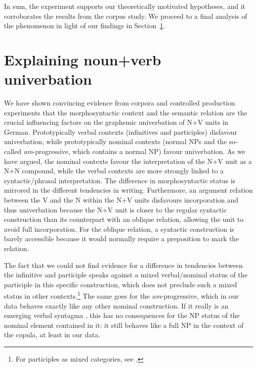 \documentclass[biblatex, charis, linguex]{glossa}\usepackage{knitr}
\begin{document}
In sum, the experiment supports our theoretically motivated hypotheses, and it corroborates the results from the corpus study.
We proceed to a final analysis of the phenomenon in light of our findings in Section~\ref{sec:explainingnounverbuniverbation}.





\section{Explaining noun+verb univerbation}
\label{sec:explainingnounverbuniverbation}

We have shown convincing evidence from corpora and controlled production experiments that the morphosyntactic context and the semantic relation are the crucial influencing factors on the graphemic univerbation of N+V units in German.
Prototypically verbal contexts (infinitives and participles) disfavour univerbation, while prototypically nominal contexts (normal NPs and the so-called \textit{am}-progressive, which contains a normal NP) favour univerbation.
As we have argued, the nominal contexts favour the interpretation of the N+V unit as a N+N compound, while the verbal contexts are more strongly linked to a syntactic\slash phrasal interpretation.
The difference in morphosyntactic status is mirrored in the different tendencies in writing.
Furthermore, an argument relation between the V and the N within the N+V units disfavours incorporation and thus univerbation because the N+V unit is closer to the regular syntactic construction than its counterpart with an oblique relation, allowing the unit to avoid full incorporation.
For the oblique relation, a syntactic construction is barely accessible because it would normally require a preposition to mark the relation.

The fact that we could not find evidence for a difference in tendencies between the infinitive and participle speaks against a mixed verbal\slash nominal status of the participle in this specific construction, which does not preclude such a mixed status in other contexts.\footnote{%
For participles as mixed categories, see \citet{BorikGehrke2019}.}
The same goes for the \textit{am}-progressive, which in our data behaves exactly like any other nominal construction.
If it really is an emerging verbal syntagma \citep{AnthonissenEa2016}, this has no consequences for the NP status of the nominal element contained in it: it still behaves like a full NP in the context of the copula, at least in our data.
\end{document}

